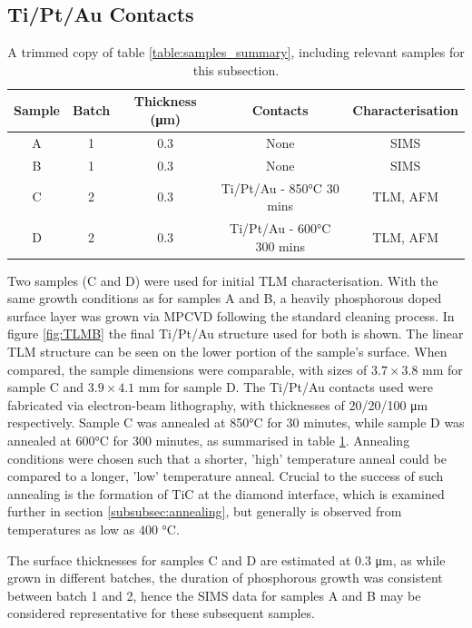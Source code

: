 \subsection{Ti/Pt/Au Contacts}
\begin{table}[h]
\centering
\caption{A trimmed copy of table \ref{table:samples_summary}, including relevant samples for this subsection.}
\label{table:short_samples_summary}
\begin{tabular}{|c|c|c|c|c|}
\hline
Sample & Batch & Thickness (\si{\micro\metre}) & Contacts & Characterisation \\
\hline
A & 1 & 0.3 & None & SIMS \\
B & 1 & 0.3 & None & SIMS \\
C & 2 & 0.3 & Ti/Pt/Au - 850\si{\degreeCelsius} 30 mins  & TLM, AFM \\
D & 2 & 0.3 & Ti/Pt/Au - 600\si{\degreeCelsius} 300 mins & TLM, AFM \\
\hline
\end{tabular}
\end{table}
Two samples (C and D) were used for initial TLM characterisation. With the same growth conditions as for samples A and B, a heavily phosphorous doped surface layer was grown via MPCVD following the standard cleaning process. In figure \ref{fig:TLMB} the final Ti/Pt/Au structure used for both is shown. The linear TLM structure can be seen on the lower portion of the sample's surface. When compared, the sample dimensions were comparable, with sizes of $3.7\times3.8$ \si{\milli\metre} for sample C and $3.9\times4.1$ \si{\milli\metre} for sample D. The Ti/Pt/Au contacts used were fabricated via electron-beam lithography, with thicknesses of 20/20/100 \si{\micro\metre} respectively. Sample C was annealed at 850\si{\degreeCelsius} for 30 minutes, while sample D was annealed at 600\si{\degreeCelsius} for 300 minutes, as summarised in table \ref{table:short_samples_summary}. Annealing conditions were chosen such that a shorter, 'high' temperature anneal could be compared to a longer, 'low' temperature anneal. Crucial to the success of such annealing is the formation of TiC at the diamond interface, which is examined further in section \ref{subsubsec:annealing}, but generally is observed from temperatures as low as $400$ \si{\degreeCelsius}.

The surface thicknesses for samples C and D are estimated at 0.3 \si{\micro\metre}, as while grown in different batches, the duration of phosphorous growth was consistent between batch 1 and 2, hence the SIMS data for samples A and B may be considered representative for these subsequent samples.

